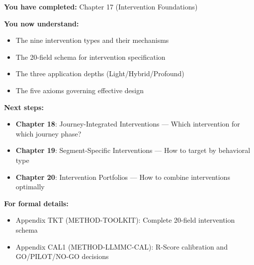 \begin{tcolorbox}[colback=purple!5!white, colframe=purple!75!black,
    title=Reading Path]

\textbf{You have completed:} Chapter 17 (Intervention Foundations)

\textbf{You now understand:}
\begin{itemize}[nosep]
\item The nine intervention types and their mechanisms
\item The 20-field schema for intervention specification
\item The three application depths (Light/Hybrid/Profound)
\item The five axioms governing effective design
\end{itemize}

\textbf{Next steps:}
\begin{itemize}[nosep]
\item \textbf{Chapter 18}: Journey-Integrated Interventions --- Which intervention for which journey phase?
\item \textbf{Chapter 19}: Segment-Specific Interventions --- How to target by behavioral type
\item \textbf{Chapter 20}: Intervention Portfolios --- How to combine interventions optimally
\end{itemize}

\textbf{For formal details:}
\begin{itemize}[nosep]
\item Appendix TKT (METHOD-TOOLKIT): Complete 20-field intervention schema
\item Appendix CAL1 (METHOD-LLMMC-CAL): R-Score calibration and GO/PILOT/NO-GO decisions
\end{itemize}
\end{tcolorbox}


